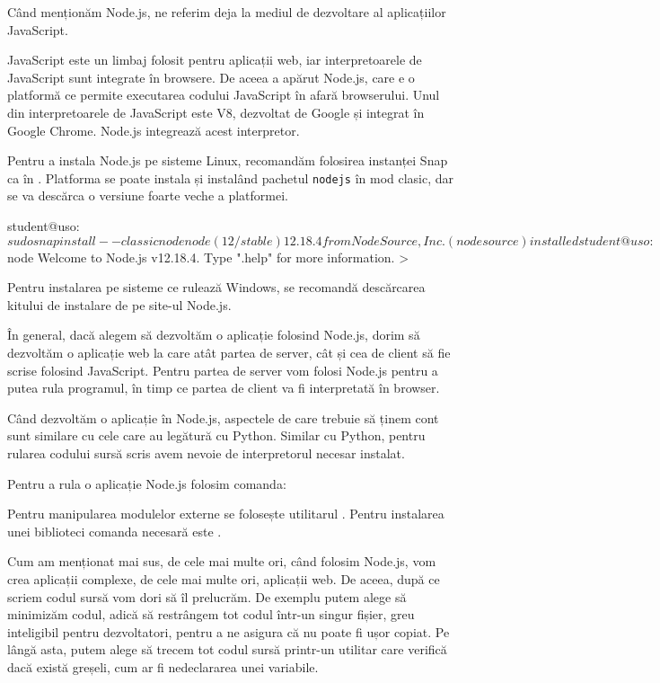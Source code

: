 Când menționăm Node.js, ne referim deja la mediul de dezvoltare al aplicațiilor JavaScript.

JavaScript este un limbaj folosit pentru aplicații web, iar interpretoarele de JavaScript sunt integrate în browsere.
De aceea a apărut Node.js, care e o platformă ce permite executarea codului JavaScript în afară browserului.
Unul din interpretoarele de JavaScript este V8, dezvoltat de Google și integrat în Google Chrome.
Node.js integrează acest interpretor.

Pentru a instala Node.js pe sisteme Linux, recomandăm folosirea instanței Snap ca în .
Platforma se poate instala și instalând pachetul \texttt{nodejs} în mod clasic, dar se va descărca o versiune foarte veche a platformei.

\begin{screen}[caption={Instalare Node.js},label={lst:appdev:install-nodejs}]
student@uso:~$ sudo snap install --classic node
node (12/stable) 12.18.4 from NodeSource, Inc.
(nodesource) installed

student@uso:~$ node
Welcome to Node.js v12.18.4.
Type ".help" for more information.
>
\end{screen}

Pentru instalarea pe sisteme ce rulează Windows, se recomandă descărcarea kitului de instalare de pe site-ul Node.js.

În general, dacă alegem să dezvoltăm o aplicație folosind Node.js, dorim să dezvoltăm o aplicație web la care atât partea de server, cât și cea de client să fie scrise folosind JavaScript.
Pentru partea de server vom folosi Node.js pentru a putea rula programul, în timp ce partea de client va fi interpretată în browser.

Când dezvoltăm o aplicație în Node.js, aspectele de care trebuie să ținem cont sunt similare cu cele care au legătură cu Python.
Similar cu Python, pentru rularea codului sursă scris avem nevoie de interpretorul necesar instalat.

Pentru a rula o aplicație Node.js folosim comanda:


Pentru manipularea modulelor externe se folosește utilitarul .
Pentru instalarea unei biblioteci comanda necesară este .

Cum am menționat mai sus, de cele mai multe ori, când folosim Node.js, vom crea aplicații complexe, de cele mai multe ori, aplicații web.
De aceea, după ce scriem codul sursă vom dori să îl prelucrăm.
De exemplu putem alege să minimizăm codul, adică să restrângem tot codul într-un singur fișier, greu inteligibil pentru dezvoltatori, pentru a ne asigura că nu poate fi ușor copiat.
Pe lângă asta, putem alege să trecem tot codul sursă printr-un utilitar care verifică dacă există greșeli, cum ar fi nedeclararea unei variabile.

